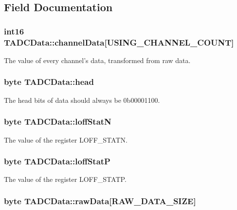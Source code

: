 \subsection{Field Documentation}
\hypertarget{struct_t_a_d_c_data_a51d30c3c2c3622e1e6e521cb8100209d}{
\subsubsection[{channel\-Data}]{\setlength{\rightskip}{0pt plus 5cm}int16 T\-A\-D\-C\-Data\-::channel\-Data\mbox{[}{\bf U\-S\-I\-N\-G\-\_\-\-C\-H\-A\-N\-N\-E\-L\-\_\-\-C\-O\-U\-N\-T}\mbox{]}}}\label{struct_t_a_d_c_data_a51d30c3c2c3622e1e6e521cb8100209d}
The value of every channel's data, transformed from raw data. \hypertarget{struct_t_a_d_c_data_a1801fde7da36697bfb69b689e69dcea0}{
\subsubsection[{head}]{\setlength{\rightskip}{0pt plus 5cm}byte T\-A\-D\-C\-Data\-::head}}\label{struct_t_a_d_c_data_a1801fde7da36697bfb69b689e69dcea0}
The head bits of data should always be 0b00001100. \hypertarget{struct_t_a_d_c_data_a514639df5e96bcd485f3f1265b69c8ad}{
\subsubsection[{loff\-Stat\-N}]{\setlength{\rightskip}{0pt plus 5cm}byte T\-A\-D\-C\-Data\-::loff\-Stat\-N}}\label{struct_t_a_d_c_data_a514639df5e96bcd485f3f1265b69c8ad}
The value of the register L\-O\-F\-F\-\_\-\-S\-T\-A\-T\-N. \hypertarget{struct_t_a_d_c_data_af4ececaa8f89b0c4f7fc0a5e8af51957}{
\subsubsection[{loff\-Stat\-P}]{\setlength{\rightskip}{0pt plus 5cm}byte T\-A\-D\-C\-Data\-::loff\-Stat\-P}}\label{struct_t_a_d_c_data_af4ececaa8f89b0c4f7fc0a5e8af51957}
The value of the register L\-O\-F\-F\-\_\-\-S\-T\-A\-T\-P. \hypertarget{struct_t_a_d_c_data_a6f8de47858b52ff0e3612ebff5b3680b}{
\subsubsection[{raw\-Data}]{\setlength{\rightskip}{0pt plus 5cm}byte T\-A\-D\-C\-Data\-::raw\-Data\mbox{[}{\bf R\-A\-W\-\_\-\-D\-A\-T\-A\-\_\-\-S\-I\-Z\-E}\mbox{]}}}\label{struct_t_a_d_c_data_a6f8de47858b52ff0e3612ebff5b3680b}
